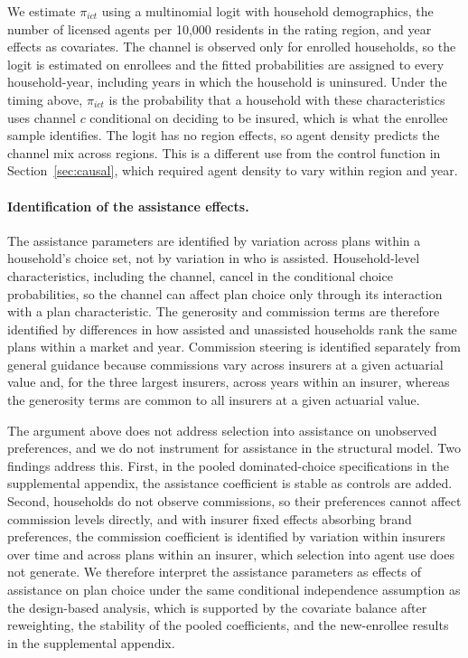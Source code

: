 \documentclass[12pt]{article}
\begin{document}
We estimate $\pi_{ict}$ using a multinomial logit with household demographics, the number of licensed agents per 10,000 residents in the rating region, and year effects as covariates. The channel is observed only for enrolled households, so the logit is estimated on enrollees and the fitted probabilities are assigned to every household-year, including years in which the household is uninsured. Under the timing above, $\pi_{ict}$ is the probability that a household with these characteristics uses channel $c$ conditional on deciding to be insured, which is what the enrollee sample identifies. The logit has no region effects, so agent density predicts the channel mix across regions. This is a different use from the control function in Section~\ref{sec:causal}, which required agent density to vary within region and year.

\paragraph{Identification of the assistance effects.} The assistance parameters are identified by variation across plans within a household's choice set, not by variation in who is assisted. Household-level characteristics, including the channel, cancel in the conditional choice probabilities, so the channel can affect plan choice only through its interaction with a plan characteristic. The generosity and commission terms are therefore identified by differences in how assisted and unassisted households rank the same plans within a market and year. Commission steering is identified separately from general guidance because commissions vary across insurers at a given actuarial value and, for the three largest insurers, across years within an insurer, whereas the generosity terms are common to all insurers at a given actuarial value.

The argument above does not address selection into assistance on unobserved preferences, and we do not instrument for assistance in the structural model. Two findings address this. First, in the pooled dominated-choice specifications in the supplemental appendix, the assistance coefficient is stable as controls are added. Second, households do not observe commissions, so their preferences cannot affect commission levels directly, and with insurer fixed effects absorbing brand preferences, the commission coefficient is identified by variation within insurers over time and across plans within an insurer, which selection into agent use does not generate. We therefore interpret the assistance parameters as effects of assistance on plan choice under the same conditional independence assumption as the design-based analysis, which is supported by the covariate balance after reweighting, the stability of the pooled coefficients, and the new-enrollee results in the supplemental appendix.
\end{document}
